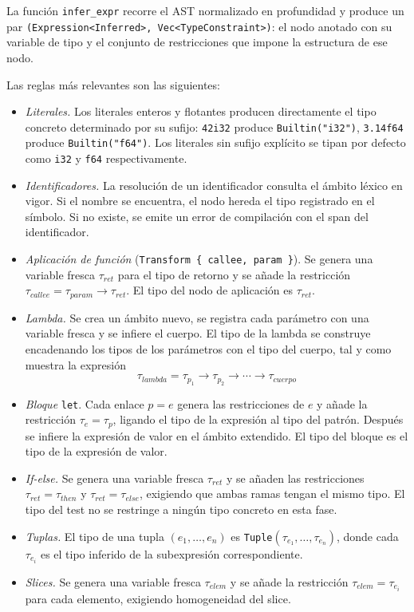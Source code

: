 La función \lstinline|infer_expr| recorre el AST normalizado en profundidad y produce un par \lstinline|(Expression<Inferred>, Vec<TypeConstraint>)|: el nodo anotado con su variable de tipo y el conjunto de restricciones que impone la estructura de ese nodo.

Las reglas más relevantes son las siguientes:

\begin{itemize}
  \item \textit{Literales.} Los literales enteros y flotantes producen directamente el tipo concreto determinado por su sufijo: \lstinline|42i32| produce \lstinline|Builtin("i32")|, \lstinline|3.14f64| produce \lstinline|Builtin("f64")|. Los literales sin sufijo explícito se tipan por defecto como \lstinline|i32| y \lstinline|f64| respectivamente.

  \item \textit{Identificadores.} La resolución de un identificador consulta el ámbito léxico en vigor. Si el nombre se encuentra, el nodo hereda el tipo registrado en el símbolo. Si no existe, se emite un error de compilación con el span del identificador.

  \item \textit{Aplicación de función} (\texttt{Transform \{ callee, param \}}). Se genera una variable fresca $\tau_{ret}$ para el tipo de retorno y se añade la restricción $\tau_{callee} = \tau_{param} \to \tau_{ret}$. El tipo del nodo de aplicación es $\tau_{ret}$.

  \item \textit{Lambda.} Se crea un ámbito nuevo, se registra cada parámetro con una variable fresca y se infiere el cuerpo. El tipo de la lambda se construye encadenando los tipos de los parámetros con el tipo del cuerpo, tal y como muestra la expresión
  \[\tau_{lambda} = \tau_{p_1} \to \tau_{p_2} \to \cdots \to \tau_{cuerpo}\]

  \item \textit{Bloque} \texttt{let}. Cada enlace $p = e$ genera las restricciones de $e$ y añade la restricción $\tau_e = \tau_p$, ligando el tipo de la expresión al tipo del patrón. Después se infiere la expresión de valor en el ámbito extendido. El tipo del bloque es el tipo de la expresión de valor.

  \item \textit{If-else.} Se genera una variable fresca $\tau_{ret}$ y se añaden las restricciones $\tau_{ret} = \tau_{then}$ y $\tau_{ret} = \tau_{else}$, exigiendo que ambas ramas tengan el mismo tipo. El tipo del test no se restringe a ningún tipo concreto en esta fase.

  \item \textit{Tuplas.} El tipo de una tupla $(e_1, \ldots, e_n)$ es \lstinline|Tuple|$(\tau_{e_1}, \ldots, \tau_{e_n})$, donde cada $\tau_{e_i}$ es el tipo inferido de la subexpresión correspondiente.

  \item \textit{Slices.} Se genera una variable fresca $\tau_{elem}$ y se añade la restricción $\tau_{elem} = \tau_{e_i}$ para cada elemento, exigiendo homogeneidad del slice.
\end{itemize}

